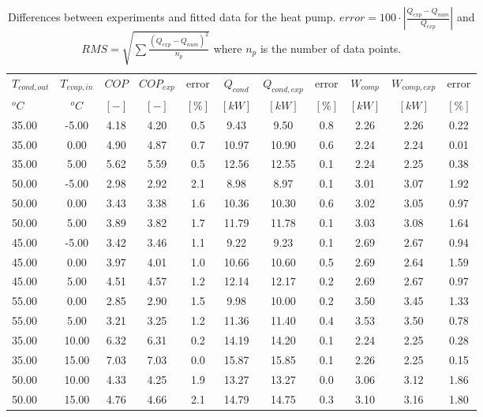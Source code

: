 \documentclass[english]{SPFShortReport}
\begin{document}
\begin{table}[!ht]
\begin{small}
\caption{Differences between experiments and fitted data for the heat pump.          $error=100 \cdot |\frac{Q_{exp}-Q_{num}}{Q_{exp}}|$ and $RMS = \sqrt { \sum{\frac{(Q_{exp}-Q_{num})^2}{n_p}} }$ where $n_p$ is the number of data points.}
\begin{center}
\resizebox{12cm}{!} 
{
\begin{tabular}{l | c c c c c c c c c c } 
\hline
\hline
$T_{cond,out}$ &$T_{evap,in}$ &$COP$ &$COP_{exp}$ &error &$Q_{cond}$ &$Q_{cond,exp}$ &error &$W_{comp}$ &$W_{comp,exp}$ &error \\ 
$^oC$ &$^oC$ &$[-]$ &$[-]$ &$[\%]$ &$[kW]$ &$[kW]$ &$[\%]$ &$[kW]$ &$[kW]$ &$[\%]$\\ 
\hline
35.00  & -5.00 & 4.18 & 4.20 & 0.5 & 9.43 & 9.50 & 0.8 & 2.26 & 2.26 & 0.22\\ 
35.00  & 0.00 & 4.90 & 4.87 & 0.7 & 10.97 & 10.90 & 0.6 & 2.24 & 2.24 & 0.01\\ 
35.00  & 5.00 & 5.62 & 5.59 & 0.5 & 12.56 & 12.55 & 0.1 & 2.24 & 2.25 & 0.38\\ 
50.00  & -5.00 & 2.98 & 2.92 & 2.1 & 8.98 & 8.97 & 0.1 & 3.01 & 3.07 & 1.92\\ 
50.00  & 0.00 & 3.43 & 3.38 & 1.6 & 10.36 & 10.30 & 0.6 & 3.02 & 3.05 & 0.97\\ 
50.00  & 5.00 & 3.89 & 3.82 & 1.7 & 11.79 & 11.78 & 0.1 & 3.03 & 3.08 & 1.64\\ 
45.00  & -5.00 & 3.42 & 3.46 & 1.1 & 9.22 & 9.23 & 0.1 & 2.69 & 2.67 & 0.94\\ 
45.00  & 0.00 & 3.97 & 4.01 & 1.0 & 10.66 & 10.60 & 0.5 & 2.69 & 2.64 & 1.59\\ 
45.00  & 5.00 & 4.51 & 4.57 & 1.2 & 12.14 & 12.17 & 0.2 & 2.69 & 2.67 & 0.97\\ 
55.00  & 0.00 & 2.85 & 2.90 & 1.5 & 9.98 & 10.00 & 0.2 & 3.50 & 3.45 & 1.33\\ 
55.00  & 5.00 & 3.21 & 3.25 & 1.2 & 11.36 & 11.40 & 0.4 & 3.53 & 3.50 & 0.78\\ 
35.00  & 10.00 & 6.32 & 6.31 & 0.2 & 14.19 & 14.20 & 0.1 & 2.24 & 2.25 & 0.28\\ 
35.00  & 15.00 & 7.03 & 7.03 & 0.0 & 15.87 & 15.85 & 0.1 & 2.26 & 2.25 & 0.15\\ 
50.00  & 10.00 & 4.33 & 4.25 & 1.9 & 13.27 & 13.27 & 0.0 & 3.06 & 3.12 & 1.86\\ 
50.00  & 15.00 & 4.76 & 4.66 & 2.1 & 14.79 & 14.75 & 0.3 & 3.10 & 3.16 & 1.80\\ 

\end{tabular}}
\end{center}
\end{small}
\end{table}
\end{document}
